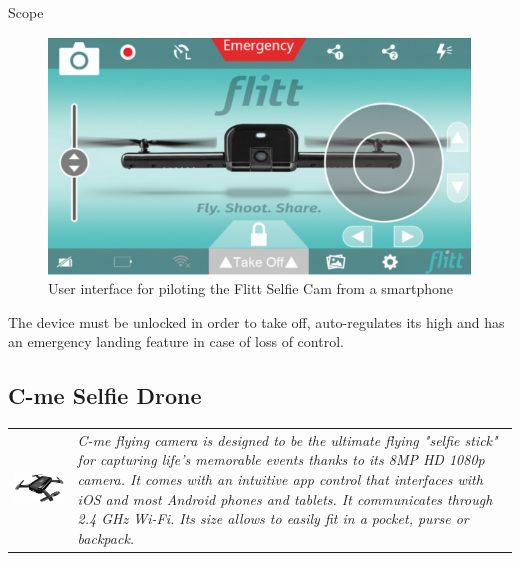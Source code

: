 \begin{chaptercover}{Scope}
\begin{figure}[H]
  \centering
  \includegraphics[width=0.7\linewidth]{figures/flitt-selfie-cam-ui}
  \caption{User interface for piloting the Flitt Selfie Cam from a smartphone}
  \label{fig:flitt-selfie-cam}
\end{figure}

The device must be unlocked in order to take off, auto-regulates its high and has an emergency landing feature in case of loss of control.

\subsection{C-me Selfie Drone}

\begin{center}
\begin{tabular}{m{5cm}m{12.3cm}}
\hyphenation{produced}
\includegraphics[width=\linewidth]{figures/cme-selfie-drone} & \textit{C-me flying camera is designed to be the ultimate flying "selfie stick" for capturing life’s memorable events thanks to its 8MP HD 1080p camera. It comes with an intuitive app control that interfaces with iOS and most Android phones and tablets. It communicates through 2.4 GHz Wi-Fi. Its size allows to easily fit in a pocket, purse or backpack.} \\
\end{tabular}
\end{center}


\end{chaptercover}
